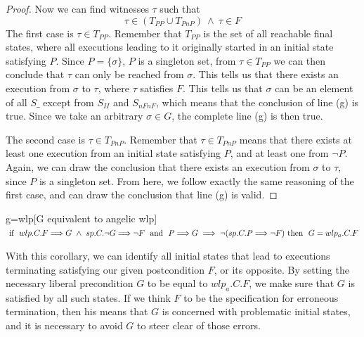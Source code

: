 \begin{proof}
Now we can find witnesses $\tau$ such that
$$
\tau\in (T_{PP}\cup T_{PnP})\ \wedge\ \tau\in F
$$
The first case is $\tau\in T_{PP}$. 
Remember that $T_{PP}$ is the set of all reachable final states, where all executions leading to it originally started in an initial state satisfying $P$. 
Since $P=\{\sigma\}$, $P$ is a singleton set, from $\tau\in T_{PP}$ we can then conclude that $\tau$ can only be reached from $\sigma$. 
This tells us that there exists an execution from $\sigma$ to $\tau$, where $\tau$ satisfies $F$. 
This tells us that $\sigma$ can be an element of all $S\_$ except from $S_{II}$ and $ S_{nFnF}$, which means that the conclusion of line (g) is true. 
Since we take an arbitrary $\sigma\in G$, the complete line (g) is then true.

The second case is $\tau\in T_{PnP}$. 
Remember that $\tau\in T_{PnP}$ means that there exists at least one execution from an initial state satisfying $P$, and at least one from $\neg P$. 
Again, we can draw the conclusion that there exists an execution from $\sigma$ to $\tau$, since $P$ is a singleton set. 
From here, we follow exactly the same reasoning of the first case, and can draw the conclusion that line (g) is valid.
\end{proof}

\begin{corollary}{g=wlp}[G equivalent to angelic wlp]
	\ \\
	$\text{ if } \ wlp.C.F{\implies} G \ \wedge\ 
	sp.C.\neg G {\implies} \neg F 
	\ \text{ and } \ 
	P{\implies} G \implies \neg(sp.C.P {\implies} \neg F) \\
	\text{ then }\ G = wlp_a.C.F$
\end{corollary}

With this corollary, we can identify all initial states that lead to executions terminating satisfying our given postcondition $F$, or its opposite. 
By setting the necessary liberal precondition $G$ to be equal to $wlp_a.C.F$, we make sure that $G$ is satisfied by all such states. 
If we think $F$ to be the specification for erroneous termination, then his means that $G$ is concerned with \imptt{all} problematic initial states, and it is necessary to avoid $G$ to steer clear of those errors. 


